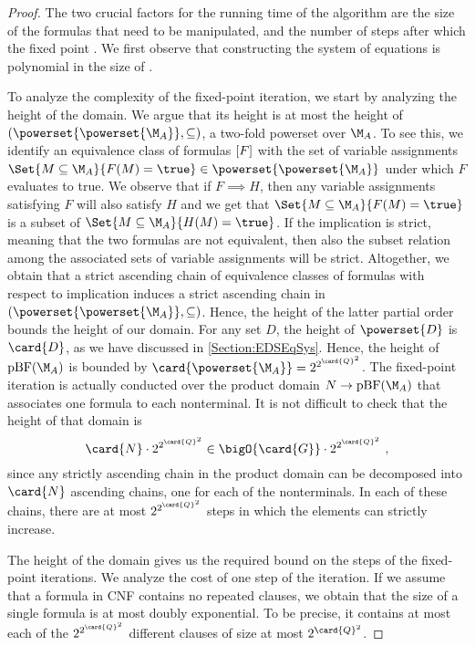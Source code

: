 \documentclass[../../diss.tex]{subfiles}
\begin{document}
\begin{proof}
    The two crucial factors for the running time of the algorithm are the size of the formulas that need to be manipulated, and the number of steps after which the fixed point .
%
    We first observe that constructing the system of equations is polynomial in the size of .

    To analyze the complexity of the fixed-point iteration, we start by analyzing the height of the domain.
    We argue that its height is at most the height of $(\powerset{\powerset{\nfatransmonoid{A}}}, \subseteq)$, a two-fold powerset over $\nfatransmonoid{A}$.
    To see this, we identify an equivalence class of formulas $[F]$ with the set of variable assignments $\Set{ M \subseteq \nfatransmonoid{A}}{ F(M) = \true  } \in \powerset{\powerset{\nfatransmonoid{A}}}$ under which $F$ evaluates to true.
    We observe that if $F \implies H$, then any variable assignments satisfying $F$ will also satisfy $H$ and we get that $\Set{ M \subseteq \nfatransmonoid{A}}{ F(M) = \true  }$ is a subset of $\Set{ M \subseteq \nfatransmonoid{A}}{ H(M) = \true  }$.
    If the implication is strict, meaning that the two formulas are not equivalent, then also the subset relation among the associated sets of variable assignments will be strict.
    Altogether, we obtain that a strict ascending chain of equivalence classes of formulas with respect to implication induces a strict ascending chain in $(\powerset{\powerset{\nfatransmonoid{A}}}, \subseteq)$.
    Hence, the height of the latter partial order bounds the height of our domain.
    For any set $D$, the height of $\powerset{D}$ is $\card{D}$, as we have discussed in \cref{Section:EDSEqSys}.
    Hence, the height of $\pBF(\nfatransmonoid{A})$ is bounded by $\card{\powerset{\nfatransmonoid{A}}} = 2^{2^{\card{Q}^2}}$.
    The fixed-point iteration is actually conducted over the product domain $N \to \pBF(\nfatransmonoid{A})$ that associates one formula to each nonterminal.
    It is not difficult to check that the height of that domain is
    \[
        \card{N} \cdot 2^{2^{\card{Q}^2}} \in \bigO{\card{G}} \cdot 2^{2^{\card{Q}^2}}
        \ ,
    \]
    since any strictly ascending chain in the product domain can be decomposed into $\card{N}$ ascending chains, one for each of the nonterminals.
    In each of these chains, there are at most $2^{2^{\card{Q}^2}}$ steps in which the elements can strictly increase.

    The height of the domain gives us the required bound on the steps of the fixed-point iterations.
    We analyze the cost of one step of the iteration.
    If we assume that a formula in CNF contains no repeated clauses, we obtain that the size of a single formula is at most doubly exponential.
    To be precise, it contains at most each of the $2^{2^{\card{Q}^2}}$ different clauses of size at most $2^{\card{Q}^2}$.


\end{proof}
\end{document}
